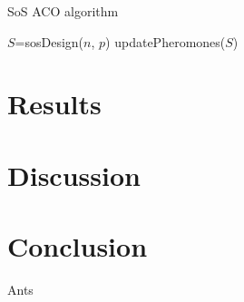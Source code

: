 \documentclass[preprint,12pt,authoryear]{elsarticle}
\begin{document}
\begin{algorithm}
	\caption{SoS ACO algorithm}
	\label{al:ACO}
	\begin{algorithmic}[1]
		\State $S$=sosDesign($n$, $p$)
		\State updatePheromones($S$)
		\EndWhile
		\EndProcedure
	\end{algorithmic}
\end{algorithm}



\section{Results}

\section{Discussion}

\section{Conclusion}

Ants\\



\renewcommand\bibname{References}
 






\end{document}
